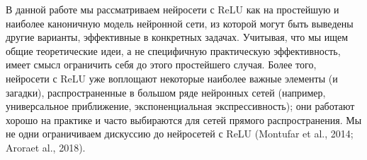 \documentclass[russian]{lecture-notes}
\begin{document}
	В данной работе мы  рассматриваем нейросети с ReLU как на простейшую и наиболее каноничную модель нейронной сети,  из которой могут быть выведены другие варианты, эффективные в конкретных задачах. Учитывая, что мы ищем общие теоретические идеи, а не специфичную практическую эффективность, имеет смысл ограничить себя до этого простейшего случая. Более того, нейросети с ReLU уже воплощают некоторые наиболее важные элементы (и загадки), распространенные в большом ряде нейронных сетей (например, универсальное приближение, экспоненциальная экспрессивность); они работают хорошо на практике и часто выбираются для сетей прямого распространения. Мы не одни ограничиваем дискуссию до нейросетей с ReLU  (Montufar et al., 2014; Aroraet al., 2018).
	
	
	
	
\end{document}
